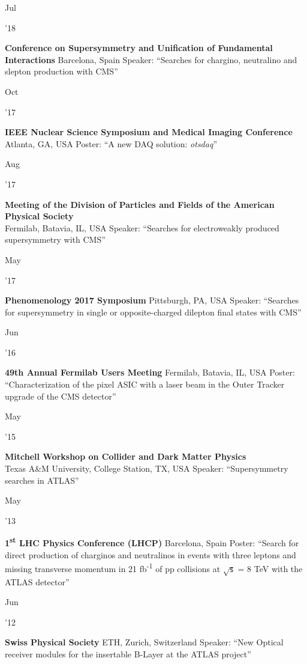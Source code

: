 \documentclass[]{cv} %
\begin{document}
\begin{entrylist}

  \entrytwo
  {\parbox[t]{\parboxWidthOne}{Jul}\parbox[t]{\parboxWidthTwo}{\hfill '18}}
  {\textbf{Conference on Supersymmetry and Unification of Fundamental Interactions}}
  {Barcelona, Spain}
  {Speaker: ``Searches for chargino, neutralino and slepton production with CMS''}

  \entrytwo
  {\parbox[t]{\parboxWidthOne}{Oct}\parbox[t]{\parboxWidthTwo}{\hfill '17}}
  {\textbf{IEEE Nuclear Science Symposium and Medical Imaging Conference}}
  {Atlanta, GA, USA}
  {Poster: ``A new DAQ solution: \textit{otsdaq}''}

  \entry
  {\parbox[t]{\parboxWidthOne}{Aug}\parbox[t]{\parboxWidthTwo}{\hfill '17}}
  {\textbf{Meeting of the Division of Particles and Fields of the American
  Physical Society}\\}
  {Fermilab, Batavia, IL, USA}
  {Speaker: ``Searches for electroweakly produced supersymmetry with CMS''}

  \entry
  {\parbox[t]{\parboxWidthOne}{May}\parbox[t]{\parboxWidthTwo}{\hfill '17}}
  {\textbf{Phenomenology 2017 Symposium}}
  {Pittsburgh, PA, USA}
  {Speaker: ``Searches for supersymmetry in single or opposite-charged dilepton final states with CMS''}

  \entry
  {\parbox[t]{\parboxWidthOne}{Jun}\parbox[t]{\parboxWidthTwo}{\hfill '16}}
  {\textbf{49th Annual Fermilab Users Meeting}}
  {Fermilab, Batavia, IL, USA}
  {Poster: ``Characterization of the pixel ASIC with a laser beam in the Outer Tracker upgrade of the CMS detector''}

  \entry
  {\parbox[t]{\parboxWidthOne}{May}\parbox[t]{\parboxWidthTwo}{\hfill '15}}
  {\textbf{Mitchell Workshop on Collider and Dark Matter Physics}\\}
  {Texas A\&M University, College Station, TX, USA}
  {Speaker: ``Supersymmetry searches in ATLAS''}

  \entry
  {\parbox[t]{\parboxWidthOne}{May}\parbox[t]{\parboxWidthTwo}{\hfill '13}}
  {\textbf{1\textsuperscript{st} LHC Physics Conference (LHCP)}}
  {Barcelona, Spain}
  {Poster: ``Search for direct production of charginos and neutralinos in events with three
    leptons and missing transverse momentum in 21 fb\textsuperscript{-1} of pp collisions at $\sqrt{\mathsf{s}}$ = 8 TeV with the ATLAS
  detector''}

  \entry
  {\parbox[t]{\parboxWidthOne}{Jun}\parbox[t]{\parboxWidthTwo}{\hfill '12}}
  {\textbf{Swiss Physical Society}}
  {ETH, Zurich, Switzerland}
  {Speaker: ``New Optical receiver modules for the insertable B-Layer at the ATLAS project''}


\end{entrylist}
\end{document}
